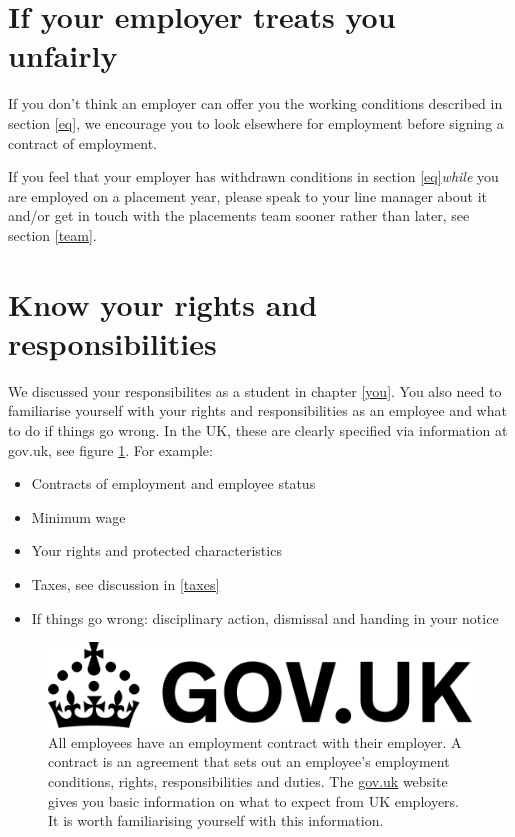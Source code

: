\documentclass[
]{book}
\providecommand{\tightlist}{%
  \setlength{\itemsep}{0pt}\setlength{\parskip}{0pt}}
\begin{document}
\section{If your employer treats you unfairly}\label{unfair}

If you don't think an employer can offer you the working conditions described in section \ref{eq}, we encourage you to look elsewhere for employment before signing a contract of employment.

If you feel that your employer has withdrawn conditions in section \ref{eq}\emph{while} you are employed on a placement year, please speak to your line manager about it and/or get in touch with the placements team sooner rather than later, see section \ref{team}.

\section{Know your rights and responsibilities}\label{rights}

We discussed your responsibilites as a student in chapter \ref{you}. You also need to familiarise yourself with your rights and responsibilities as an employee and what to do if things go wrong. In the UK, these are clearly specified via information at gov.uk, see figure \ref{fig:gov-fig}. For example:

\begin{itemize}
\tightlist
\item
  Contracts of employment and employee status \citep{contract, employee}
\item
  Minimum wage \citep{minimumwage}
\item
  Your rights and protected characteristics \citep{discrimination}
\item
  Taxes, see discussion in \ref{taxes} \citep{national, apply, council-tax, exemption2}
\item
  If things go wrong: disciplinary action, dismissal and handing in your notice \citep{disciplinary, dismissal, notice}
\end{itemize}

\begin{figure}

{\centering \includegraphics[width=0.5\linewidth]{images/govuk} 

}

\caption{All employees have an employment contract with their employer. A contract is an agreement that sets out an employee's employment conditions, rights, responsibilities and duties. The \href{https://www.gov.uk/}{gov.uk} website gives you basic information on what to expect from UK employers. It is worth familiarising yourself with this information. \citep{contract, employee}}\label{fig:gov-fig}
\end{figure}
\end{document}

